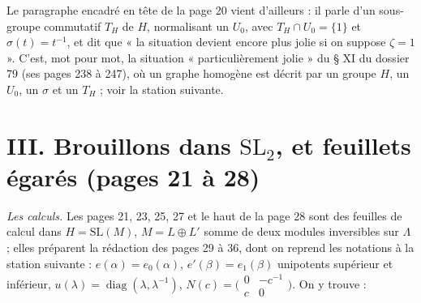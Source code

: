 \documentclass[11pt,a4paper]{article}
\begin{document}
Le paragraphe encadré en tête de la page 20 vient d'ailleurs : il parle d'un
sous-groupe commutatif $T_H$ de $H$, normalisant un $U_0$, avec $T_H \cap U_0
= \{1\}$ et $\sigma(t) = t^{-1}$, et dit que « la situation devient encore plus
jolie si on suppose $\zeta = 1$ ». C'est, mot pour mot, la situation
« particulièrement jolie » du § XI du dossier 79 (ses pages 238 à 247), où un
graphe homogène est décrit par un groupe $H$, un $U_0$, un $\sigma$ et un
$T_H$ ; voir la station suivante.

\section*{III. Brouillons dans $\mathrm{SL}_2$, et feuillets égarés (pages 21 à 28)}

\emph{Les calculs.} Les pages 21, 23, 25, 27 et le haut de la page 28 sont
des feuilles de calcul dans $H = \mathrm{SL}(M)$, $M = L \oplus L'$ somme de
deux modules inversibles sur $\Lambda$ ; elles préparent la rédaction des
pages 29 à 36, dont on reprend les notations à la station suivante : $e(\alpha)
= e_0(\alpha)$, $e'(\beta) = e_1(\beta)$ unipotents supérieur et inférieur,
$u(\lambda) = \operatorname{diag}(\lambda, \lambda^{-1})$, $N(c) =
\bigl(\begin{smallmatrix} 0 & -c^{-1} \\ c & 0\end{smallmatrix}\bigr)$. On y
trouve :
\end{document}
